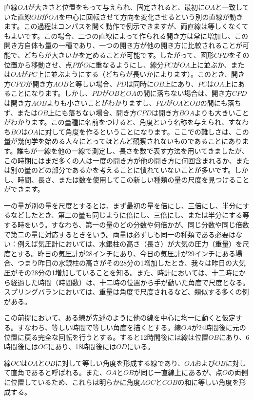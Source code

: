 \documentclass[a4paper,11pt,openany]{ltjsbook}
\begin{document}
直線$OA$が大きさと位置をもって与えられ、固定されると、最初に$OA$と一致していた直線$OB$が$OA$を中心に回転させて方向を変化させるという別の直線が動きます。この過程はコンパスを開く動作で例示できますが、両直線は等しくなくてもよいです。この場合、二つの直線によって作られる開き方は常に増加し、この開き方自体も量の一種であり、一つの開き方が他の開き方に比較されることが可能で、どちらが大きいかを定めることが可能です。したがって、図形$CPD$をその位置から移動させ、点$P$が$O$に重なるようにし、線分$PC$が$OA$上に並ぶか、または$OA$が$PC$上に並ぶようにする（どちらが長いかによります）。このとき、開き方$CPD$が開き方$AOB$と等しい場合、$PD$は同時に$OB$上にあり、$PC$は$OA$上にあることになります。しかし、$PD$が$OB$と$OA$の間に落ちない場合は、開き方$CPD$は開き方$AOB$よりも小さいことがわかりますし、$PD$が$OA$と$OB$の間にも落ちず、または$OB$上にも落ちない場合、開き方$CPD$は開き方$BOA$よりも大きいことがわかります。この量種に名前をつけると、角度という名称を与えられ、すなわち$BO$は$OA$に対して角度を作るということになります。ここでの難しさは、この量が幾何学を始める人々にとってほとんど観察されないものであることにあります。誰もが一線を他の一線で測定し、長さを数で表す方法を用いてきましたが、この時期にはまだ多くの人は一度の開き方が他の開き方に何回含まれるか、または別の量のどの部分であるかを考えることに慣れていないことが多いです。しかし、時間、長さ、または数を使用してこの新しい種類の量の尺度を見つけることができます。

一の量が別の量を尺度とするとは、まず最初の量を倍にし、三倍にし、半分にするなどしたとき、第二の量も同じように倍にし、三倍にし、または半分にする等する時をいう。すなわち、第一の量のどの分数や何倍かが、同じ分数や同じ倍数で第二の量に対応するときをいう。両量は必ずしも同一の種類である必要はない：例えば気圧計においては、水銀柱の高さ（長さ）が大気の圧力（重量）を尺度とする。昨日の気圧計が28インチにあり、今日の気圧計が29インチにある場合、つまり昨日の水銀柱の高さがその28分の1増加したとき、我々は昨日の大気圧がその28分の1増加していることを知る。また、時計においては、十二時にから経過した時間（時間数）は、十二時の位置から手が動いた角度で尺度となる。スプリングバランにおいては、重量は角度で尺度されるなど、類似する多くの例がある。

この前提において、ある線が先述のように他の線を中心に均一に動くと仮定する。すなわち、等しい時間で等しい角度を描くとする。線$OA$が24時間後に元の位置に戻る完全な回転を行うとする。すると12時間後には線は位置$OB$にあり、6時間後には$OC$にあり、18時間後には$OD$にいる。

線$OC$は$OA$と$OB$に対して等しい角度を形成する線であり、$OA$および$OB$に対して直角であると呼ばれる。また、$OA$と$OB$が同じ一直線上にあるが、点$O$の両側に位置しているため、これらは明らかに角度$AOC$と$COB$の和に等しい角度を形成する。
\end{document}
